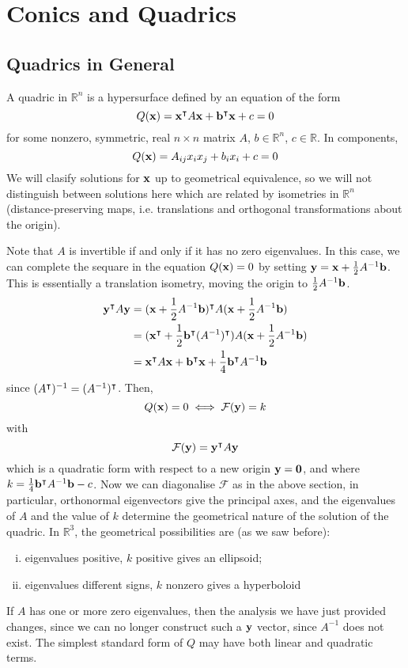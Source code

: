 \documentclass{article}
\begin{document}
\section{Conics and Quadrics}
\subsection{Quadrics in General}
A quadric in $\mathbb R^n$ is a hypersurface defined by an equation of the form
\[ Q(\vb x) = \vb x^\intercal A \vb x + \vb b^\intercal \vb x + c = 0 \]
for some nonzero, symmetric, real $n \times n$ matrix $A$, $b \in \mathbb R^n$, $c \in \mathbb R$. In components,
\[ Q(\vb x) = A_{ij}x_ix_j + b_ix_i + c = 0 \]
We will clasify solutions for $\vb x$ up to geometrical equivalence, so we will not distinguish between solutions here which are related by isometries in $\mathbb R^n$ (distance-preserving maps, i.e. translations and orthogonal transformations about the origin).

Note that $A$ is invertible if and only if it has no zero eigenvalues. In this case, we can complete the sequare in the equation $Q(\vb x) = 0$ by setting $\vb y = \vb x + \frac{1}{2}A^{-1} \vb b$. This is essentially a translation isometry, moving the origin to $\frac{1}{2}A^{-1} \vb b$.
\begin{align*}
	\vb y^\intercal A \vb y & = (\vb x + \frac{1}{2}A^{-1}\vb b)^\intercal A (\vb x + \frac{1}{2}A^{-1}\vb b)                         \\
	                         & = (\vb x^\intercal + \frac{1}{2}\vb b^\intercal(A^{-1})^\intercal) A (\vb x + \frac{1}{2}A^{-1}\vb b) \\
	                         & = \vb x^\intercal A \vb x + \vb b^\intercal \vb x + \frac{1}{4}\vb b^\intercal A^{-1}\vb b
\end{align*}
since $(A^\intercal)^{-1} = (A^{-1})^\intercal$. Then,
\[ Q(\vb x) = 0 \iff \mathcal F(\vb y) = k \]
with
\[ \mathcal F(\vb y) = \vb y^\intercal A \vb y \]
which is a quadratic form with respect to a new origin $\vb y = \vb 0$, and where $k = \frac{1}{4}\vb b^\intercal A^{-1}\vb b - c$. Now we can diagonalise $\mathcal F$ as in the above section, in particular, orthonormal eigenvectors give the principal axes, and the eigenvalues of $A$ and the value of $k$ determine the geometrical nature of the solution of the quadric. In $\mathbb R^3$, the geometrical possibilities are (as we saw before):
\begin{enumerate}[(i)]
	\item eigenvalues positive, $k$ positive gives an ellipsoid;
	\item eigenvalues different signs, $k$ nonzero gives a hyperboloid
\end{enumerate}
If $A$ has one or more zero eigenvalues, then the analysis we have just provided changes, since we can no longer construct such a $\vb y$ vector, since $A^{-1}$ does not exist. The simplest standard form of $Q$ may have both linear and quadratic terms.
\end{document}
